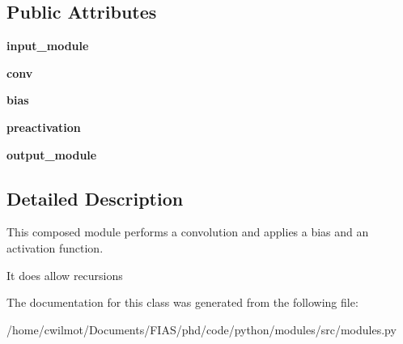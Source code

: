 \subsection*{Public Attributes}
\begin{DoxyCompactItemize}
\item 
\mbox{\label{classmodules_1_1_time_convolutional_layer_module_ae677272a2f73e35433150f011bcc4338}} 
{\bfseries input\+\_\+module}
\item 
\mbox{\label{classmodules_1_1_time_convolutional_layer_module_a1bedce8250b63fb0b1987279947da8f2}} 
{\bfseries conv}
\item 
\mbox{\label{classmodules_1_1_time_convolutional_layer_module_a96caa16034d47b22cb8af83339c0e0bb}} 
{\bfseries bias}
\item 
\mbox{\label{classmodules_1_1_time_convolutional_layer_module_aa3826156422a0d3c52cf81c2a7500b6e}} 
{\bfseries preactivation}
\item 
\mbox{\label{classmodules_1_1_time_convolutional_layer_module_a822d0c075c48bae8208648ae3bbf49ff}} 
{\bfseries output\+\_\+module}
\end{DoxyCompactItemize}


\subsection{Detailed Description}
This composed module performs a convolution and applies a bias and an activation function. 

It does allow recursions 

The documentation for this class was generated from the following file\+:\begin{DoxyCompactItemize}
\item 
/home/cwilmot/\+Documents/\+F\+I\+A\+S/phd/code/python/modules/src/modules.\+py\end{DoxyCompactItemize}
